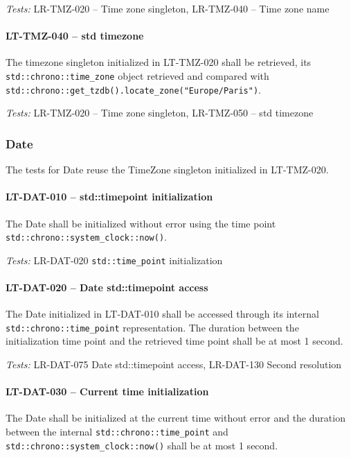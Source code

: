 \textit{Tests: } LR-TMZ-020 -- Time zone singleton,
                 LR-TMZ-040 -- Time zone name

\paragraph{LT-TMZ-040 -- std time\textunderscore zone}
The time\textunderscore zone singleton initialized in LT-TMZ-020 shall
be retrieved, its \lstinline{std::chrono::time_zone} object retrieved
and compared with
\lstinline{std::chrono::get_tzdb().locate_zone("Europe/Paris")}.


\textit{Tests: } LR-TMZ-020 -- Time zone singleton,
                 LR-TMZ-050 -- std time\textunderscore zone

\subsubsection{Date}
The tests for Date reuse the TimeZone singleton initialized
in LT-TMZ-020.
                 
\paragraph{LT-DAT-010 -- std::time\textunderscore point initialization}
The Date shall be initialized without error using the time point
\lstinline{std::chrono::system_clock::now()}.

\textit{Tests: } LR-DAT-020 \lstinline{std::time_point} initialization

\paragraph{LT-DAT-020 -- Date std::time\textunderscore point access}
The Date initialized in LT-DAT-010 shall be accessed through its
internal \lstinline{std::chrono::time_point} representation.
The duration between the initialization time point and the retrieved
time point shall be at most 1 second.

\textit{Tests: } LR-DAT-075 Date std::time\textunderscore point access,
LR-DAT-130 Second resolution

\paragraph{LT-DAT-030 -- Current time initialization}
The Date shall be initialized at the current time without error
and the duration between the internal \lstinline{std::chrono::time_point}
and \lstinline{std::chrono::system_clock::now()} shall be at most 1 second.

